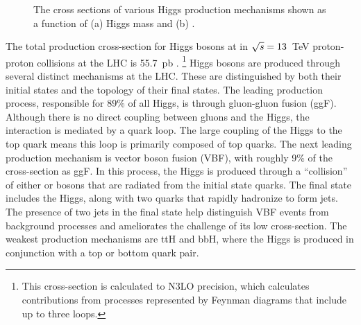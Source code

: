 \begin{figure}[h!]
\captionsetup[subfigure]{position=b}
\centering
{}
\label{fig:}
\caption{The cross sections of various Higgs production mechanisms shown as a function of (a) Higgs mass and (b) \sqrts.}
\end{figure}


The total production cross-section for Higgs bosons at in $\sqrt{s}=13$~TeV proton-proton collisions at the LHC is 55.7~pb \cite{higgsCross}.
\footnote{This cross-section is calculated to N3LO precision, which calculates contributions from processes represented by Feynman diagrams that include up to three loops.}
Higgs bosons are produced through several distinct mechanisms at the LHC.
These are distinguished by both their initial states and the topology of their final states.
The leading production process, responsible for 89\% of all Higgs, is through gluon-gluon fusion (ggF).
Although there is no direct coupling between gluons and the Higgs, the interaction is mediated by a quark loop.
The large coupling of the Higgs to the top quark means this loop is primarily composed of top quarks.
The next leading production mechanism is vector boson fusion (VBF), with roughly 9\% of the cross-section as ggF.
In this process, the Higgs is produced through a ``collision'' of either \W or \Z bosons that are radiated from the initial state quarks.
The final state includes the Higgs, along with two quarks that rapidly hadronize to form jets.
The presence of two jets in the final state help distinguish VBF events from background processes and ameliorates the challenge of its low cross-section.
The weakest production mechanisms are ttH and bbH, where the Higgs is produced in conjunction with a top or bottom quark pair.


